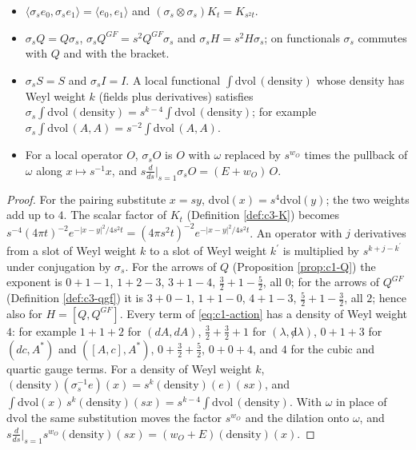\begin{lemma}
\label{lem:c6-data}
\begin{itemize}
\item $\langle\sigma_s e_0,\sigma_s e_1\rangle=\langle e_0,e_1\rangle$ and $(\sigma_s\otimes\sigma_s)K_t=K_{s^2t}$.
\item $\sigma_s Q=Q\sigma_s$, $\sigma_s Q^{GF}=s^2Q^{GF}\sigma_s$ and $\sigma_s H=s^2H\sigma_s$; on functionals $\sigma_s$ commutes with $Q$ and with the bracket.
\item $\sigma_s S=S$ and $\sigma_s I=I$. A local functional $\int\mathrm{dvol}\,(\text{density})$ whose density has Weyl weight $k$ (fields plus derivatives) satisfies $\sigma_s\int\mathrm{dvol}\,(\text{density})=s^{k-4}\int\mathrm{dvol}\,(\text{density})$; for example $\sigma_s\int\mathrm{dvol}\,(A,A)=s^{-2}\int\mathrm{dvol}\,(A,A)$.
\item For a local operator $O$, $\sigma_s O$ is $O$ with $\omega$ replaced by $s^{w_O}$ times the pullback of $\omega$ along $x\mapsto s^{-1}x$, and $s\frac{d}{ds}\big|_{s=1}\sigma_s O=(E+w_O)\,O$.
\end{itemize}
\end{lemma}

\begin{proof}
For the pairing substitute $x=sy$, $\mathrm{dvol}(x)=s^4\mathrm{dvol}(y)$; the two weights add up to $4$. The scalar factor of $K_t$ (Definition \ref{def:c3-K}) becomes $s^{-4}(4\pi t)^{-2}e^{-|x-y|^2/4s^2t}=(4\pi s^2t)^{-2}e^{-|x-y|^2/4s^2t}$. An operator with $j$ derivatives from a slot of Weyl weight $k$ to a slot of Weyl weight $k^{\prime}$ is multiplied by $s^{k+j-k^{\prime}}$ under conjugation by $\sigma_s$. For the arrows of $Q$ (Proposition \ref{prop:c1-Q}) the exponent is $0+1-1$, $1+2-3$, $3+1-4$, $\tfrac32+1-\tfrac52$, all $0$; for the arrows of $Q^{GF}$ (Definition \ref{def:c3-qgf}) it is $3+0-1$, $1+1-0$, $4+1-3$, $\tfrac52+1-\tfrac32$, all $2$; hence also for $H=[Q,Q^{GF}]$. Every term of \eqref{eq:c1-action} has a density of Weyl weight $4$: for example $1+1+2$ for $(dA,dA)$, $\tfrac32+\tfrac32+1$ for $(\lambda,{\not d}\lambda)$, $0+1+3$ for $(dc,A^*)$ and $([A,c],A^*)$, $0+\tfrac32+\tfrac52$, $0+0+4$, and $4$ for the cubic and quartic gauge terms. For a density of Weyl weight $k$, $(\text{density})(\sigma_s^{-1}e)(x)=s^{k}(\text{density})(e)(sx)$, and $\int\mathrm{dvol}(x)\,s^k(\text{density})(sx)=s^{k-4}\int\mathrm{dvol}\,(\text{density})$. With $\omega$ in place of $\mathrm{dvol}$ the same substitution moves the factor $s^{w_O}$ and the dilation onto $\omega$, and $s\frac{d}{ds}\big|_{s=1}s^{w_O}(\text{density})(sx)=(w_O+E)(\text{density})(x)$.
\end{proof}

